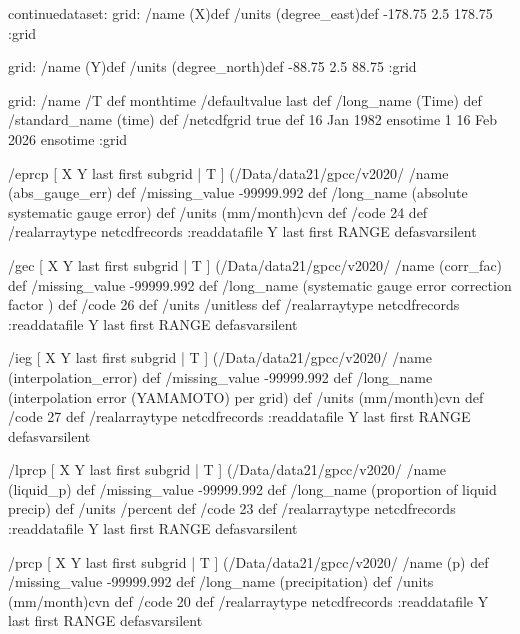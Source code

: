 \begin{ingrid}
continuedataset:
   grid:
   /name (X)def
   /units (degree_east)def
   -178.75 2.5 178.75
   :grid

   grid:
   /name (Y)def
   /units (degree_north)def
   -88.75 2.5 88.75
   :grid


   grid:
   /name /T def
   monthtime
   /defaultvalue {last} def
   /long_name (Time) def
   /standard_name (time) def
   /netcdfgrid true def
   16 Jan 1982 ensotime
   1
   16 Feb 2026 ensotime
   :grid

   /eprcp{
      [ X Y last first subgrid | T ] (/Data/data21/gpcc/v2020/%
      /name (abs_gauge_err) def
      /missing_value -99999.992 def
      /long_name (absolute systematic gauge error) def
      /units (mm/month)cvn def
      /code 24 def
      /realarraytype netcdfrecords :readdatafile
      Y last first RANGE
   }defasvarsilent

   /gec{
      [ X Y last first subgrid | T ] (/Data/data21/gpcc/v2020/%
      /name (corr_fac) def
       /missing_value -99999.992 def
       /long_name (systematic gauge error correction factor	) def
       /code 26 def
       /units /unitless def
       /realarraytype netcdfrecords :readdatafile
       Y last first RANGE
   }defasvarsilent

   /ieg{
      [ X Y last first subgrid | T ] (/Data/data21/gpcc/v2020/%
      /name (interpolation_error) def
       /missing_value -99999.992 def
       /long_name (interpolation error (YAMAMOTO) per grid) def
       /units (mm/month)cvn def
       /code 27 def
       /realarraytype netcdfrecords :readdatafile
       Y last first RANGE
   }defasvarsilent

   /lprcp{
      [ X Y last first subgrid | T ] (/Data/data21/gpcc/v2020/%
      /name (liquid_p) def
       /missing_value -99999.992 def
       /long_name (proportion of liquid precip) def
       /units /percent def
       /code 23 def
       /realarraytype netcdfrecords :readdatafile
       Y last first RANGE
   }defasvarsilent

   /prcp{
      [ X Y last first subgrid | T ] (/Data/data21/gpcc/v2020/%
      /name (p) def
       /missing_value -99999.992 def
       /long_name (precipitation) def
       /units (mm/month)cvn def
       /code 20 def
       /realarraytype netcdfrecords :readdatafile
       Y last first RANGE
   }defasvarsilent


\end{ingrid}
